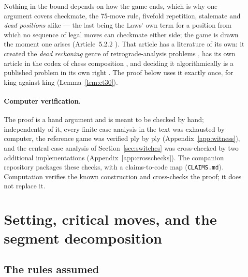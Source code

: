 \documentclass[11pt]{article}
\theoremstyle{definition}
\theoremstyle{remark}
\theoremstyle{plain}
\begin{document}
Nothing in the bound depends on how the game ends, which is why one argument
covers checkmate, the 75-move rule, fivefold repetition, stalemate and
\emph{dead positions} alike --- the last being the Laws' own term for a
position from which no sequence of legal moves can checkmate either side;
the game is drawn the moment one arises (Article~5.2.2
\cite{fide2023laws}). That article has a literature of its own: it
created the \emph{dead reckoning} genre of retrograde-analysis problems
\cite{turnbull2001,buchanan2001}, has its own article in the codex of
chess composition \cite{wfcccodex}, and deciding it algorithmically is a
published problem in its own right \cite{ambrona2022}. The proof below
uses it exactly once, for king against king (Lemma~\ref{lem:ct30}).

\paragraph{Computer verification.}
The proof is a hand argument and is meant to be checked by hand;
independently of it, every finite case analysis in the text was
exhausted by computer, the reference game was verified ply by ply
(Appendix~\ref{app:witness}), and the central case analysis of
Section~\ref{sec:switches} was cross-checked by two additional
implementations (Appendix~\ref{app:crosschecks}). The companion
repository \cite{repo} packages these checks, with a claims-to-code map
(\texttt{CLAIMS.md}).
Computation verifies the known construction and cross-checks the proof;
it does not replace it.

\section{Setting, critical moves, and the segment decomposition}
\label{sec:setting}

\subsection{The rules assumed}\label{sec:rules}
\end{document}
